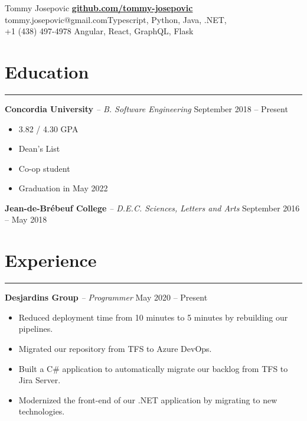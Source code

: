 \documentclass[11pt]{article}
\let\origsection\section
\renewcommand{\section}[2]{
    \origsection*{\LARGE \color{#2}#1} \hrule
}
\renewcommand{\subsection}[4]{
    \textcolor{#4}{\large \textbf{#1} \textit{-- #2} \hfill {#3}}
}
\begin{document}
{\large
    {\Huge Tommy Josepovic} \hfill  \textbf{\href{http://www.github.com/tommy-josepovic}{github.com/tommy-josepovic}}\\
    tommy.josepovic@gmail.com\hfill Typescript, Python, Java, .NET,\\
    +1 (438) 497-4978 \hfill Angular, React, GraphQL, Flask
}

\section{Education}{blacker}
\subsection{Concordia University}{B. Software Engineering}{September 2018 -- Present}{blacker}
\begin{itemize}[noitemsep]
    \item 3.82 / 4.30 GPA
    \item Dean's List
    \item Co-op student
    \item Graduation in May 2022
    
\end{itemize}
\subsection{Jean-de-Brébeuf College}{D.E.C. Sciences, Letters and Arts}{September 2016 -- May 2018}{blacker}

\section{Experience}{blacker}
\subsection{Desjardins Group}{Programmer}{May 2020 -- Present}{blacker}
\begin{itemize}[noitemsep]
    \item Reduced deployment time from 10 minutes to 5 minutes by rebuilding our pipelines.
    \item Migrated our repository from TFS to Azure DevOps.
    \item Built a C\# application to automatically migrate our backlog from TFS to Jira Server.
    \item Modernized the front-end of our .NET application by migrating to new technologies.
\end{itemize}
\end{document}
